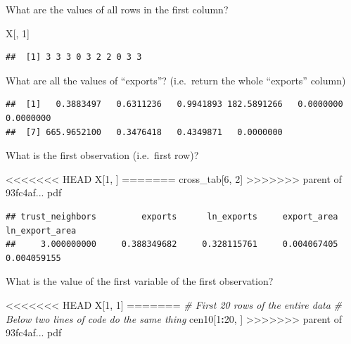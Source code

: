 \documentclass[]{book}
\newenvironment{Shaded}{\begin{snugshade}}{\end{snugshade}}
\newcommand{\CommentTok}[1]{\textcolor[rgb]{0.56,0.35,0.01}{\textit{#1}}}
\newcommand{\DecValTok}[1]{\textcolor[rgb]{0.00,0.00,0.81}{#1}}
\newcommand{\KeywordTok}[1]{\textcolor[rgb]{0.13,0.29,0.53}{\textbf{#1}}}
\newcommand{\NormalTok}[1]{#1}
\newcommand{\OperatorTok}[1]{\textcolor[rgb]{0.81,0.36,0.00}{\textbf{#1}}}
\newcommand{\StringTok}[1]{\textcolor[rgb]{0.31,0.60,0.02}{#1}}
\theoremstyle{definition}
\theoremstyle{definition}
\theoremstyle{definition}
\theoremstyle{remark}
\begin{document}
What are the values of all rows in the first column?

\begin{Shaded}
\begin{Highlighting}[]
\NormalTok{X[, }\DecValTok{1}\NormalTok{]}
\end{Highlighting}
\end{Shaded}

\begin{verbatim}
##  [1] 3 3 3 0 3 2 2 0 3 3
\end{verbatim}

What are all the values of ``exports''? (i.e.~return the whole ``exports'' column)

\begin{Shaded}
\end{Shaded}

\begin{verbatim}
##  [1]   0.3883497   0.6311236   0.9941893 182.5891266   0.0000000   0.0000000
##  [7] 665.9652100   0.3476418   0.4349871   0.0000000
\end{verbatim}

What is the first observation (i.e.~first row)?

\begin{Shaded}
\begin{Highlighting}[]
<<<<<<< HEAD
\NormalTok{X[}\DecValTok{1}\NormalTok{, ]}
=======
\NormalTok{cross_tab[}\DecValTok{6}\NormalTok{, }\DecValTok{2}\NormalTok{]}
>>>>>>> parent of 93fc4af... pdf
\end{Highlighting}
\end{Shaded}

\begin{verbatim}
## trust_neighbors         exports      ln_exports     export_area  ln_export_area 
##     3.000000000     0.388349682     0.328115761     0.004067405     0.004059155
\end{verbatim}

What is the value of the first variable of the first observation?

\begin{Shaded}
\begin{Highlighting}[]
<<<<<<< HEAD
\NormalTok{X[}\DecValTok{1}\NormalTok{, }\DecValTok{1}\NormalTok{]}
=======
\CommentTok{# First 20 rows of the entire data}
\CommentTok{# Below two lines of code do the same thing}
\NormalTok{cen10[}\DecValTok{1}\OperatorTok{:}\DecValTok{20}\NormalTok{, ]}
>>>>>>> parent of 93fc4af... pdf
\end{Highlighting}
\end{Shaded}
\end{document}
